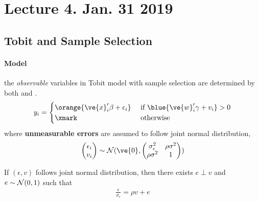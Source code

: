 \documentclass[11pt]{article}
\begin{document}
	\section{Lecture 4. Jan. 31 2019}
		\subsection{Tobit and Sample Selection}
			\paragraph{Model} the \emph{observable} variables in Tobit model with sample selection are determined by both  and .
			\begin{gather}
				y_i = \begin{cases}
					\orange{\ve{x}_i' \beta + \epsilon_i} &\tx{ if } \blue{\ve{w}_i' \gamma + v_i} > 0 \\
					$\xmark$ &\tx{ otherwise}
				\end{cases}
			\end{gather}
			where \textbf{unmeasurable errors} are assumed to follow joint normal distribution,
			\begin{gather}
				\begin{pmatrix}
					\epsilon_i \\ v_i	
				\end{pmatrix}
				\sim \mc{N}(\ve{0},
				\begin{pmatrix}
					\sigma_{\epsilon}^2 & \rho \sigma^2 \\
					\rho \sigma^2 & 1
				\end{pmatrix})
			\end{gather}
			
			\begin{lemma}
				If $(\epsilon, v)$ follows joint normal distribution, then there exists $e \perp v$ and $e \sim \mathcal{{N}}(0,1)$ such that
				\begin{gather}
					\frac{\epsilon}{\sigma_{\epsilon}} = \rho v + e
				\end{gather}
			\end{lemma}
\end{document}
